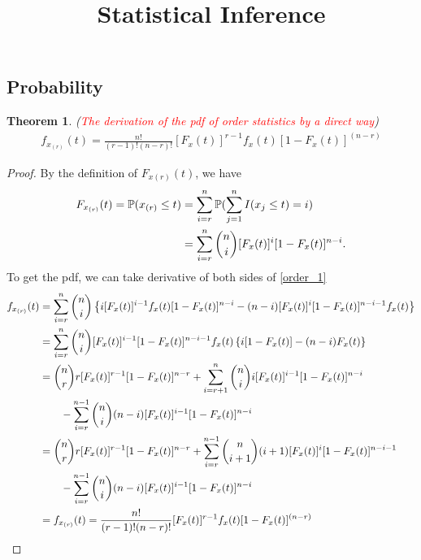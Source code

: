 \documentclass{article}
\title{\textbf{Statistical Inference}}
\author{}
\date{}
\begin{document}
\begin{CJK}{UTF8}{gbsn}

    \maketitle
    \newtheorem{Inference}{Theorem}[section]

    \section{Probability}


    \begin{Inference}
        (\textcolor{red}{\textit{The derivation of the pdf of order statistics by a direct way}})
        \begin{align}
            f_{x_{(r)}}(t)=\frac{n!}{(r-1)!(n-r)!}[F_x(t)]^{r-1}f_{x}(t)[1-F_x(t)]^{(n-r)}
        \end{align}
    \end{Inference}
    \begin{proof}
        By the definition of $F_{x(r)}(t)$, we have
        \begin{align}
            F_{x_{(r)}}(t) = \mathbb{P}(x_{(r)}\leq t) & = \sum_{i=r}^n\mathbb{P}(\sum_{j=1}^n I (x_j\leq t) = i)\notag         \\
                                                       & = \sum_{i=r}^n \binom{n}{i} [F_x(t)]^i[1-F_x(t)]^{n-i}.\label{order_1}
        \end{align}
        To get the pdf, we can take derivative of both sides of \eqref{order_1}
        \begin{align}
            f_{x_{(r)}}(t) & = \sum_{i=r}^n \binom{n}{i} \left \{ i[F_x(t)]^{i-1}f_x(t)[1-F_x(t)]^{n-i}-(n-i)[F_x(t)]^i[1-F_x(t)]^{n-i-1}f_x(t) \right \}\notag \\
                           & =\sum_{i=r}^n \binom{n}{i} [F_x(t)]^{i-1}[1-F_x(t)]^{n-i-1}f_x(t)\left \{ i[1-F_x(t)] - (n-i)F_x(t) \right \} \notag               \\
                           & = \binom{n}{r}r[F_x(t)]^{r-1}[1-F_x(t)]^{n-r} + \sum_{i=r+1}^n \binom{n}{i} i[F_x(t)]^{i-1}[1-F_x(t)]^{n-i} \notag                 \\
                           & \qquad - \sum_{i=r}^{n-1}\binom{n}{i}(n-i)[F_x(t)]^{i-1}[1-F_x(t)]^{n-i}\notag                                                     \\
                           & = \binom{n}{r}r[F_x(t)]^{r-1}[1-F_x(t)]^{n-r} + \sum_{i=r}^{n-1} \binom{n}{i+1} {(i+1)}[F_x(t)]^{i}[1-F_x(t)]^{n-i-1} \notag       \\
                           & \qquad - \sum_{i=r}^{n-1}\binom{n}{i}(n-i)[F_x(t)]^{i-1}[1-F_x(t)]^{n-i}\notag                                                     \\
                           & = f_{x_{(r)}}(t)=\frac{n!}{(r-1)!(n-r)!}[F_x(t)]^{r-1}f_{x}(t)[1-F_x(t)]^{(n-r)}\notag
        \end{align}
    \end{proof}

\end{CJK}
\end{document}
